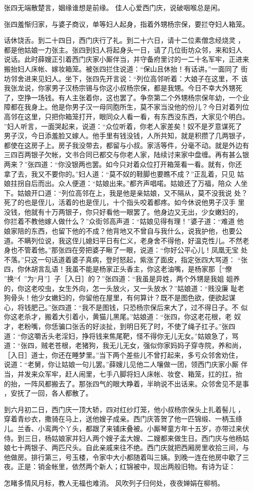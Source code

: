 张四无端散楚言，姻缘谁想是前缘。
佳人心爱西门庆，说破咽喉总是闲。

张四羞惭归家，与婆子商议，单等妇人起身，指着外甥杨宗保，要拦夺妇人箱笼。

话休饶舌。到二十四日，西门庆行了礼。到二十六日，请十二位素僧念经烧灵
，都是他姑娘一力张主。张四到妇人将起身头一日，请了几位街坊众邻，来和妇人
说话。此时薛嫂正引着西门庆家小厮伴当，并守备府里讨的一二十名军牢，正进来
搬抬妇人床帐、嫁妆箱笼。被张四拦住说道：“保山且休抬！有话讲。”一面同了
街坊邻舍进来见妇人。坐下，张四先开言说：“列位高邻听着：大娘子在这里，不
该我张龙说，你家男子汉杨宗锡与你这小叔杨宗保，都是我甥。今日不幸大外甥死
了，空挣一场钱。有人主张着你，这也罢了。争奈第二个外甥杨宗保年幼，一个业
障都在我身上。他是你男子汉一母同胞所生，莫不家当没他的份儿？今日对着列位
高邻在这里，只把你箱笼打开，眼同众人看一看，有东西没东西，大家见个明白。
”妇人听言，一面哭起来，说道：“众位听着，你老人家差矣！奴不是歹意谋死了
男子汉，今日添羞脸又嫁人。他手里有钱没钱，人所共知，就是积攒了几两银子，
都使在这房子上。房子我没带去，都留与小叔。家活等件，分毫不动。就是外边有
三四百两银子欠帐，文书合同已都交与你老人家，陆续讨来家中盘缠。再有甚么银
两来？”张四道：“你没银两也罢。如今只对着众位打开箱笼看一看。就有，你还
拿了去，我又不要你的。”妇人道：“莫不奴的鞋脚也要瞧不成？”正乱着，只见
姑娘拄拐自后而出。众人便道：“姑娘出来。”都齐声唱喏。姑娘还了万福，陪众
人坐下。姑娘开口道：“列位高邻在上，我是他是亲姑娘，又不隔从，莫不没我说
处？死了的也是侄儿，活着的也是侄儿，十个指头咬着都疼。如今休说他男子汉手
里没钱，他就有十万两银子，你只好看他一眼罢了。他身边又无出，少女嫩妇的，
你拦着不教他嫁人做什么？”众街邻高声道：“姑娘见得有理！”婆子道：“难道
他娘家陪的东西，也留下他的不成？他背地又不曾自与我什么，说我护他，也要公
道。不瞒列位说，我这侄儿媳妇平日有仁义，老身舍不得他，好温克性儿。不然老
身也不管着他。”那张四在旁把婆子瞅了一眼，说道：“你好公平心儿！凤凰无宝
处不落。”只这一句话道着婆子真病，登时怒起，紫涨了面皮，指定张四大骂道：
“张四，你休胡言乱语！我虽不能是杨家正头香主，你这老油嘴，是杨家那［“僚
”换“亻”为“月”］子［入日］的？”张四道：“我虽是异姓，两个外甥是我姐
姐养的，你这老咬虫，女生外向，怎一头放火，又一头放水？”姑娘道：“贱没廉
耻老狗骨头！他少女嫩妇的，你留他在屋里，有何算计？既不是图色欲，便欲起谋
心，将钱肥己。”张四道：“我不是图钱，只恐杨宗保后来大了，过不得日子。不
似你这老杀才，搬着大引着小，黄猫儿黑尾。”姑娘道：“张四，你这老花根，老
奴才，老粉嘴，你恁骗口张舌的好淡扯，到明日死了时，不使了绳子扛子。”张四
道：“你这嚼舌头老淫妇，挣将钱来焦尾靶，怪不得你无儿无女。”姑娘急了，骂
道：“张四，贼老苍根，老猪狗，我无儿无女，强似你家妈妈子穿寺院，养和尚，
［入日］道士，你还在睡梦里。”当下两个差些儿不曾打起来，多亏众邻舍劝住，
说道：“老舅，你让姑娘一句儿罢。”薛嫂儿见他二人嚷做一团，领西门庆家小厮
伴当，并发来众军牢，赶人闹里，七手八脚将妇人床帐、妆奁、箱笼，扛的扛，抬
的抬，一阵风都搬去了。那张四气的眼大睁着，半晌说不出话来。众邻舍见不是事
，安抚了一回，各人都散了。

到六月初二日，西门庆一顶大轿，四对红纱灯笼，他小叔杨宗保头上扎着髻儿
，穿着青纱衣，撒骑在马上，送他嫂子成亲。西门庆答贺了他一匹锦缎、一柄玉绦
儿。兰香、小鸾两个丫头，都跟了来铺床叠被。小厮琴童方年十五岁，亦带过来伏
侍。到三日，杨姑娘家并妇人两个嫂子孟大嫂、二嫂都来做生日。西门庆与他杨姑
娘七十两银子、两匹尺头。自此亲戚来往不绝。西门庆就把西厢房里收拾三间，与
他做房。排行第三，号玉楼，令家中大小都随着叫三姨。到晚一连在他房中歇了三
夜。正是：销金帐里，依然两个新人；红锦被中，现出两般旧物。有诗为证：

怎睹多情风月标，教人无福也难消。
风吹列子归何处，夜夜婵娟在柳梢。